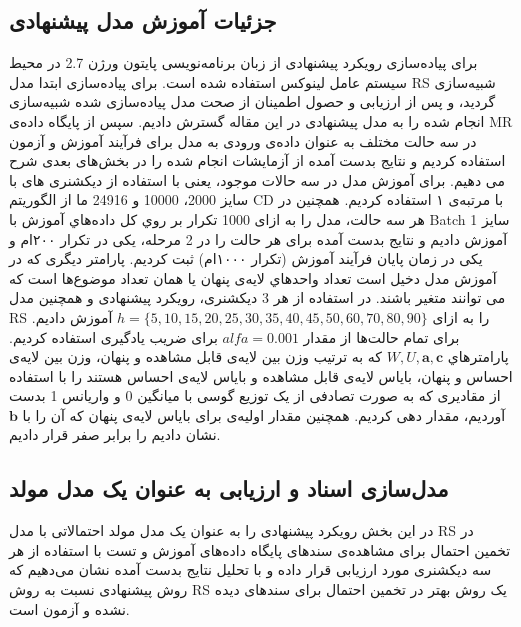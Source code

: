 \documentclass[12pt,a4paper]{article}
\begin{document}
\subsection{جزئیات آموزش مدل پیشنهادی}
\label{sec4-4}
برای پياده‌سازی رویکرد پیشنهادی از زبان برنامه‌نويسی پایتون ورژن 2.7 در محيط سيستم عامل لينوکس استفاده شده است. برای پیاده‌سازی ابتدا مدل RS شبيه‌سازی گرديد، و پس از ارزیابی  و حصول اطمینان از صحت مدل پياده‌سازی شده شبيه‌سازی انجام شده را به مدل پيشنهادی در اين مقاله گسترش دادیم. سپس از پايگاه داده‌ی MR در سه حالت مختلف به عنوان داده‌ی ورودی به مدل برای فرآيند آموزش و آزمون استفاده کرديم و نتايج بدست آمده از آزمايشات انجام شده را در بخش‌های بعدی شرح می دهيم. برای آموزش مدل در سه حالات موجود، يعنی با استفاده از ديکشنری های با سايز 2000، 10000 و 24916 ما از الگوريتم CD با مرتبه‌ی ۱ استفاده کرديم. همچنين در هر سه حالت، مدل را به ازای 1000 تکرار بر روي کل داده‌هاي آموزش با Batch سايز 1 آموزش داديم و نتايج بدست آمده برای هر حالت را در 2 مرحله، يکی در تکرار ۲۰۰ام و يکی در زمان پايان فرآيند آموزش (تکرار ۱۰۰۰ام) ثبت کرديم. پارامتر ديگری که در آموزش مدل دخيل است تعداد واحدهاي لايه‌ی پنهان يا همان تعداد موضوع‌ها است که می توانند متغير باشند. در استفاده از هر 3 ديکشنری، رويکرد پيشنهادی و همچنین مدل RS را به ازای
$h=\{5,10,15,20,25,30,35,40,45,50,60,70,80,90 \}$
آموزش داديم. برای تمام حالت‌ها از مقدار 
$alfa = 0.001$
برای ضريب يادگيری استفاده کرديم. پارامترهاي 
$W,U,\textbf{a},\textbf{c}$
که به ترتیب وزن بين لايه‌ی قابل مشاهده و پنهان، وزن بين لايه‌ی احساس و پنهان، باياس لايه‌ی قابل مشاهده و باياس لايه‌ی احساس هستند را با استفاده از مقاديری که به صورت تصادفی از يک توزیع گوسی با ميانگين 0 و واريانس 1 بدست آورديم، مقدار دهی کرديم. همچنين مقدار اوليه‌ی برای باياس لايه‌ی پنهان که آن را با 
$\textbf{b}$
نشان داديم را برابر صفر قرار داديم.

\subsection{مدل‌سازی اسناد و ارزیابی به عنوان یک مدل مولد}
\label{sec4-5}
در این بخش رویکرد پیشنهادی را به عنوان یک مدل مولد احتمالاتی با مدل RS در تخمین احتمال برای مشاهده‌ی سندهای پایگاه داده‌های آموزش و تست با استفاده از هر سه دیکشنری مورد ارزیابی قرار داده و با تحلیل نتایج بدست آمده نشان می‌‌دهیم که روش پیشنهادی نسبت به روش RS یک روش بهتر در تخمین احتمال برای سندهای دیده نشده و آزمون است. 
\end{document}
